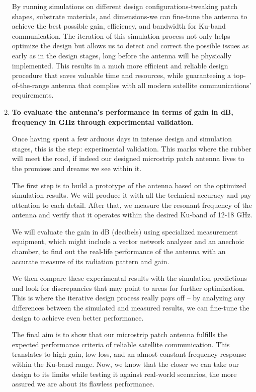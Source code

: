 \documentclass[12pt]{article}
\begin{document}
\begin{enumerate}
    \par By running simulations on different design configurations-tweaking patch shapes, substrate materials, and dimensions-we can fine-tune the antenna to achieve the best possible gain, efficiency, and bandwidth for Ku-band communication. The iteration of this simulation process not only helps optimize the design but allows us to detect and correct the possible issues as early as in the design stages, long before the antenna will be physically implemented. This results in a much more efficient and reliable design procedure that saves valuable time and resources, while guaranteeing a top-of-the-range antenna that complies with all modern satellite communications' requirements.\\

    \newpage
    \item \textbf{To evaluate the antenna’s performance in terms of gain in dB, frequency in GHz through experimental validation.}

    \par Once having spent a few arduous days in intense design and simulation stages, this is the step: experimental validation. This marks where the rubber will meet the road, if indeed our designed microstrip patch antenna lives to the promises and dreams we see within it.\\

    \par The first step is to build a prototype of the antenna based on the optimized simulation results. We will produce it with all the technical accuracy and pay attention to each detail. After that, we measure the resonant frequency of the antenna and verify that it operates within the desired Ku-band of 12-18 GHz.\\

    \par We will evaluate the gain in dB (decibels) using specialized measurement equipment, which might include a vector network analyzer and an anechoic chamber, to find out the real-life performance of the antenna with an accurate measure of its radiation pattern and gain.\\

    \par We then compare these experimental results with the simulation predictions and look for discrepancies that may point to areas for further optimization. This is where the iterative design process really pays off – by analyzing any differences between the simulated and measured results, we can fine-tune the design to achieve even better performance.\\

    \par The final aim is to show that our microstrip patch antenna fulfills the expected performance criteria of reliable satellite communication. This translates to high gain, low loss, and an almost constant frequency response within the Ku-band range. Now, we know that the closer we can take our design to its limits while testing it against real-world scenarios, the more assured we are about its flawless performance.\\
\end{enumerate}
\end{document}
